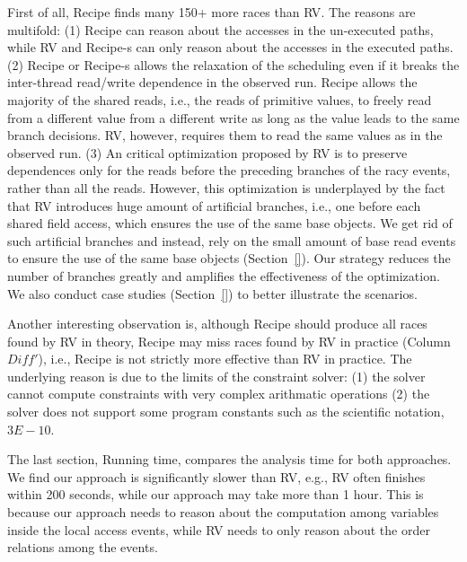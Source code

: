 First of all, {\sf Recipe} finds many 150+ more races than {\sf RV}. The reasons are multifold: (1) {\sf Recipe} can reason about the accesses in the un-executed paths, while {\sf RV} and {\sf Recipe-s} can only reason about the accesses in the executed paths. (2) {\sf Recipe} or {\sf Recipe-s} allows the relaxation of the scheduling even if it breaks the inter-thread read/write dependence in the observed run. {\sf Recipe} allows the majority of the shared reads, i.e., the reads of primitive values, to freely read from a different value from a different write as long as the value leads to the same branch decisions. {\sf RV}, however, requires them to read the same values as in the observed run. (3) An critical optimization proposed by {\sf RV} is to preserve dependences only for the reads before the preceding branches  of the racy events, rather than all the reads. However, this optimization is underplayed by the fact that {\sf RV} introduces huge amount of artificial branches, i.e., one before each shared field access, which ensures the use of the same base objects.
We get rid of such artificial branches and instead, rely on the small amount of base read events to ensure the use of the same base objects (Section~\ref{}). Our strategy reduces the number of branches greatly and amplifies the effectiveness of the optimization. We also conduct case studies (Section~\ref{}) to better illustrate the scenarios.

 

Another interesting observation is, although {\sf Recipe} should produce all races found by {\sf RV} in theory, {\sf Recipe} may miss races found by {\sf RV} in practice (Column $Diff'$), i.e., {\sf Recipe} is not strictly more effective than {\sf RV} in practice. The underlying reason is due to the limits of the constraint solver: (1) the solver cannot compute constraints with very complex arithmatic operations (2) the solver does not support some program constants such as the scientific notation, $3E-10$.

The last section, Running time, compares the analysis time for both approaches. We find our approach is significantly slower than {\sf RV}, e.g., {\sf RV} often finishes within 200 seconds, while our approach may take more than 1 hour. This is because our approach needs to reason about the computation among variables inside the local access events, while {\sf RV} needs to only reason about the order relations among the events.

